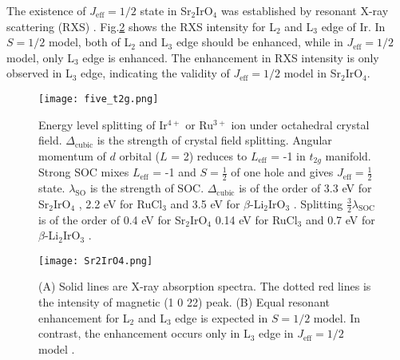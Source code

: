 The existence of $J_{\mathrm{eff}} = 1/2$ state in Sr$_2$IrO$_4$ was established by resonant X-ray scattering (RXS) \cite{kim2009phase}.
Fig.\ref{Sr2IrO4} shows the RXS intensity for L$_2$ and L$_3$ edge of Ir.
In $S = 1/2$ model, both of L$_2$ and L$_3$ edge should be enhanced, while in $J_\mathrm{eff} = 1/2$ model, only L$_3$ edge is enhanced.
The enhancement in RXS intensity is only observed in L$_3$ edge, indicating the validity of $J_\mathrm{eff} = 1/2$ model in Sr$_2$IrO$_4$.

\begin{figure}
  \centering
  \texttt{[image: five\_t2g.png]}
  \caption{Energy level splitting of Ir$^{4+}$ or Ru$^{3+}$ ion under octahedral crystal field.
  $\Delta_{\mathrm{cubic}}$ is the strength of crystal field splitting.
  Angular momentum of $d$ orbital ($L$ = 2) reduces to $L_{\mathrm{eff}}$ = -1 in $t_{2g}$ manifold.
  Strong SOC mixes $L_{\mathrm{eff}}$ = -1 and $S = \frac{1}{2}$ of one hole and gives $J_{\mathrm{eff}} = \frac{1}{2}$ state.
  $\lambda_{\mathrm{SO}}$ is the strength of SOC.
  $\Delta_{\mathrm{cubic}}$ is of the order of 3.3 eV for Sr$_2$IrO$_4$ \cite{ishii2011momentum}, 2.2 eV for RuCl$_3$ \cite{sandilands2016spin}
  and 3.5 eV for $\beta$-Li$_2$IrO$_3$ \cite{takayama2018pressure}.
  Splitting $\frac{3}{2}\lambda_{\mathrm{SOC}}$ is of the order of 0.4 eV for Sr$_2$IrO$_4$ \cite{kim2008novel} 0.14 eV for RuCl$_3$ \cite{sandilands2016spin}
  and 0.7 eV for $\beta$-Li$_2$IrO$_3$ \cite{takayama2018pressure}.}
  \label{five_t2g}
\end{figure}

\begin{figure}
  \centering
  \texttt{[image: Sr2IrO4.png]}
  \caption{(A) Solid lines are X-ray absorption spectra. The dotted red lines is the intensity of magnetic (1 0 22) peak.
  (B) Equal resonant enhancement for L$_2$ and L$_3$ edge is expected in $S = 1/2$ model. In contrast, the enhancement occurs only in L$_3$ edge in $J_\mathrm{eff} = 1/2$ model
  \cite{kim2009phase}.}
  \label{Sr2IrO4}
\end{figure}

